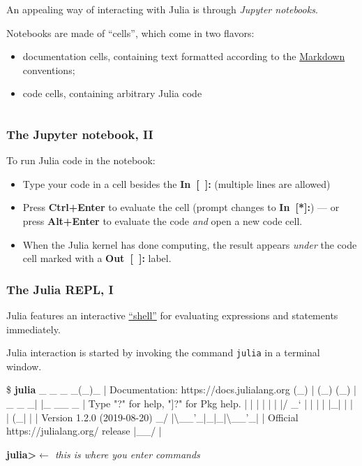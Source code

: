 \documentclass[english,serif,mathserif,xcolor=pdftex,dvipsnames,table]{beamer}
\begin{document}
\begin{frame}
\begin{columns}[t]
\begin{column}{0.5\textwidth}
      An appealing way of interacting with Julia
      is through \emph{Jupyter notebooks}.

      \+
      Notebooks are made of ``cells'', which come in two flavors:
      \begin{itemize}
      \item documentation cells, containing text formatted according to the
        \href{http://commonmark.org/help/}{Markdown} conventions;
      \item code cells, containing arbitrary Julia code
      \end{itemize}
    \end{column}
  \end{columns}
\end{frame}


\begin{frame}
  \frametitle{The Jupyter notebook, II}

  To run Julia code in the notebook:
  \begin{itemize}
  \item Type your code in a cell besides the {\ttfamily\bfseries\color{blue}
      In~[~]:} (multiple lines are allowed)
  \item Press \textbf{Ctrl+Enter} to evaluate the cell (prompt changes to
    {\ttfamily\bfseries\color{blue} In~[*]:}) --- or press \textbf{Alt+Enter} to
    evaluate the code \emph{and} open a new code cell.
  \item When the Julia kernel has done computing, the result appears \emph{under} the
    code cell marked with a {\ttfamily\bfseries\color{red} Out~[~]:} label.
  \end{itemize}

\end{frame}


\begin{frame}[fragile]
  \frametitle{The Julia REPL, I}
  Julia features an interactive
  \href{http://en.wikipedia.org/wiki/REPL}{``shell''} for evaluating
  expressions and statements immediately.

  \+
  Julia interaction is started by invoking the command
  \texttt{julia} in a terminal window.

  \+
\begin{semiverbatim}\tiny
\$ \textbf{julia}
               _
   _       _ _(_)_     |  Documentation: https://docs.julialang.org
  (_)     | (_) (_)    |
   _ _   _| |_  __ _   |  Type "?" for help, "]?" for Pkg help.
  | | | | | | |/ _` |  |
  | | |_| | | | (_| |  |  Version 1.2.0 (2019-08-20)
 _/ |{\textbackslash}__'_|_|_|{\textbackslash}__'_|  |  Official https://julialang.org/ release
|__/                   |

\textbf{julia>}{\color{blue}\normalfont\em \(\leftarrow\) this is where you enter commands}
\end{semiverbatim}
\end{frame}
\end{document}
